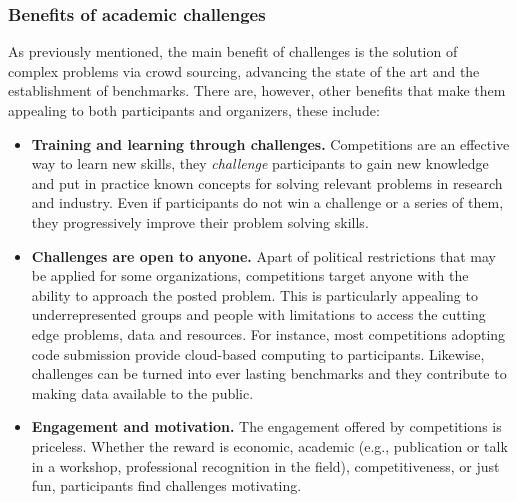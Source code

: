 \documentclass[twoside,11pt]{article}
\begin{document}
\subsubsection{Benefits of academic challenges}
As previously mentioned, the main benefit of challenges is the solution of complex problems via crowd sourcing, advancing the state of the art and the establishment of benchmarks. There are, however, other benefits that make them appealing to both participants and organizers, these include:   
\begin{itemize}
    \item \textbf{Training and learning through challenges.} Competitions are an effective way to learn new skills, they \emph{challenge} participants to gain new knowledge and put in practice known concepts for solving relevant problems in research and industry. Even if participants do not win a challenge or a series of them, they progressively improve their problem solving skills.  
    \item \textbf{Challenges are open to anyone.} Apart of political restrictions that may be applied for some organizations, competitions target anyone with the ability to approach the posted problem. This is particularly appealing to underrepresented groups and people with limitations to access the cutting edge problems, data and resources. For instance, most competitions adopting code submission provide cloud-based computing to participants. %
    Likewise, challenges can be turned into ever lasting benchmarks and they contribute to making data available to the public. 
    \item \textbf{Engagement and motivation.} The engagement offered by competitions is priceless. Whether the reward is economic, academic (e.g., publication or talk in a workshop, professional recognition in the field), competitiveness, or just fun, participants find challenges motivating. %

\end{itemize}
\end{document}
